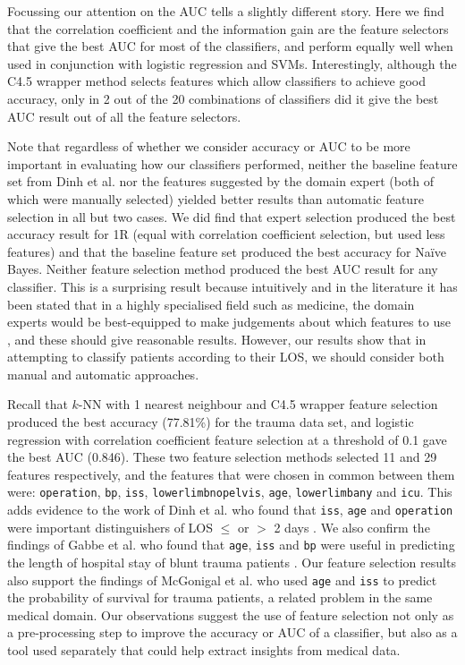 Focussing our attention on the AUC tells a slightly different story. Here we
find that the correlation coefficient and the information gain are the feature
selectors that give the best AUC for most of the classifiers, and perform
equally well when used in conjunction with logistic regression and SVMs.
Interestingly, although the C4.5
wrapper method selects features which allow classifiers to achieve good
accuracy, only in 2 out of the 20 combinations of classifiers did it give the
best AUC result out of all the feature selectors. 

Note that regardless of whether we consider accuracy or AUC to be more
important in evaluating how our classifiers performed, neither the baseline
feature set from Dinh et al. \cite{Dinh2013a} nor the features suggested by
the domain expert (both of which were manually selected) yielded better
results than automatic feature selection in all but two cases. We did find
that expert selection produced the best accuracy result for 1R (equal with
correlation coefficient selection, but used less features) and that the
baseline feature set produced the best accuracy for Na\"{i}ve Bayes. Neither
feature selection method produced the best AUC result for any classifier.
This is a surprising result because intuitively and in the literature it
has been stated that in a highly specialised field such as medicine, the domain
experts would be best-equipped to make judgements about which features to
use \cite{Witten2005}, and these should give reasonable results. However,
our results show that in attempting to classify patients according to their
LOS, we should consider both manual and automatic approaches.

Recall that $k$-NN with 1 nearest neighbour and C4.5 wrapper feature
selection produced the best accuracy (77.81\%) for the trauma data set, and
logistic regression with correlation coefficient feature selection at a
threshold of 0.1 gave the best AUC (0.846). These two feature selection
methods selected 11 and 29 features respectively, and the features that
were chosen in common between them were: \texttt{operation}, \texttt{bp},
\texttt{iss}, \texttt{lowerlimbnopelvis}, \texttt{age}, \texttt{lowerlimbany}
and \texttt{icu}. This adds evidence to the work of Dinh et al. who found
that \texttt{iss}, \texttt{age} and \texttt{operation} were important
distinguishers of LOS $\leq$ or $>$ 2 days \cite{Dinh2013a}. We also
confirm the findings of Gabbe et al. who found that \texttt{age},
\texttt{iss} and \texttt{bp} were useful in predicting the length of
hospital stay of blunt trauma patients \cite{Gabbe2005}. Our feature
selection results also
support the findings of McGonigal et al. \cite{McGonigal1993} who used
\texttt{age} and
\texttt{iss} to predict the probability of survival for trauma patients, a
related problem in the same medical domain.
Our observations suggest the use of feature selection not only as a
pre-processing step to improve the accuracy or AUC of a classifier, but also
as a tool used separately that could help extract insights from medical data.

